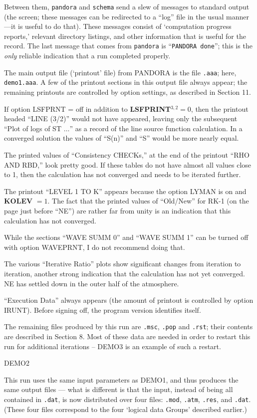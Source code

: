 Between them, {\tt pandora} and {\tt schema} send a slew of messages
to standard output (the screen; these messages can be redirected to a
``log'' file in the usual manner---it is useful to do that). These messages
consist of `computation progress reports,' relevant directory listings, and
other information that is useful for the record. The last message that comes
from {\tt pandora} is ``{\tt PANDORA done}''; this is the {\it only} reliable
indication that a run completed properly.

The main output file (`printout' file) from PANDORA is the file {\tt .aaa};
here, {\tt demo1.aaa}. A few of the printout sections in this output file
always appear; the remaining printouts are controlled by option settings,
as described in Section 11.

If option LSFPRNT = off in addition to
{\bf LSFPRINT}$^{3,2} = 0$, then the printout headed ``LINE  (3/2)''
would not have appeared, leaving only the subsequent ``Plot of logs of ST
$\ldots$'' as a record of the line source function calculation.
In a converged solution the values of ``S(n)'' and ``S'' would be 
more nearly equal.

The printed values of ``Consistency CHECKs,'' at the end of the printout
\break ``RHO AND RBD,'' look pretty good.  If these tables do not have
almost all values close to 1, then the calculation has not converged and
needs to be iterated further.

The printout ``LEVEL  1 TO K'' appears because the option LYMAN is on and
{\bf KOLEV} $= 1$. The fact that the printed values of ``Old/New'' for RK-1
(on the page just before ``NE'') are rather far from unity is an
indication that this calculation has not converged.

While the sections ``WAVE SUMM 0'' and ``WAVE SUMM 1'' can be turned off
with option WAVEPRNT, I do not recommend doing that.

The various ``Iterative Ratio'' plots show significant changes from
iteration to iteration, another strong indication that the calculation
has not yet converged. NE has settled down in the outer half of the
atmosphere.

``Execution Data'' always appears (the amount of printout is controlled
by option IRUNT). Before signing off, the program version identifies itself.

The remaining files produced by this run are {\tt .msc}, {\tt .pop} and
{\tt .rst}; their contents are described in Section 8. Most of these data are
needed in order to restart this run for additional iterations -- DEMO3
is an example of such a restart.
\blankline
\blankline
\centerline{DEMO2}
\blankline
This run uses the same input parameters as DEMO1, and thus produces the same
output files --- what is different is that the input, instead of being all
contained in {\tt .dat}, is now distributed over four files: 
{\tt .mod}, {\tt .atm}, {\tt .res}, and {\tt .dat}. (These four
files correspond to the four `logical data Groups' described earlier.)


